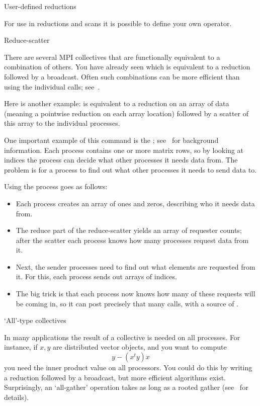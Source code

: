  {User-defined reductions}

For use in reductions and scans it is possible to define your own operator.

 {Reduce-scatter}

There are several MPI collectives that are functionally equivalent to
a combination of others. You have already seen  which
is equivalent to a reduction followed by a broadcast. Often such
combinations can be more efficient than using the individual calls;
see~.

Here is another example:  is equivalent
to a reduction on an array of data (meaning a pointwise reduction on each
array location) followed by a scatter of this array to the individual 
processes.

One important example of this command is the
;
see~ for background information.
Each process contains one or more matrix rows, so by looking at indices
the process can decide what other processes it needs data from.
The problem is for a process to find out what other processes 
it needs to send data to. 

Using  the process goes as follows:
\begin{itemize}
\item Each process creates an array of ones and zeros, describing who
  it needs data from.
\item The reduce part of the reduce-scatter yields an array of
  requester counts; after the scatter each process knows how many
  processes request data from it.
\item Next, the sender processes need to find out what elements are
  requested from it. For this, each process sends out arrays of
  indices.
\item The big trick is that each process now knows how many of these
  requests will be coming in, so it can post precisely that many
   calls, with a source of .
\end{itemize}

 {`All'-type collectives}

In many applications the result of a collective is needed on all processes.
For instance, if $x,y$ are distributed vector objects, and you want to compute
\[ y- (x^ty)x \]
you need the inner product value on all processors. You could do this
by writing a reduction followed by a broadcast, but more efficient
algorithms exist.  Surprisingly, an `all-gather' operation takes as
long as a rooted gather (see~ for details).

